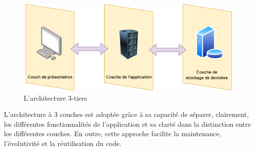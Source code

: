 \begin{figure}[H]
    \centering
    \includegraphics[width=\textwidth]{images/chp4/fig1.png}
    \caption{L’architecture 3-tiers}
    \label{fig:architecture-3-tiers}    
\end{figure}

L'architecture à 3 couches est adoptée grâce à sa capacité de  séparer, clairement, les différentes fonctionnalités de l'application et sa clarté dans la distinction entre les différentes couches. En outre, cette approche facilite la maintenance, l'évolutivité et la réutilisation du code.

